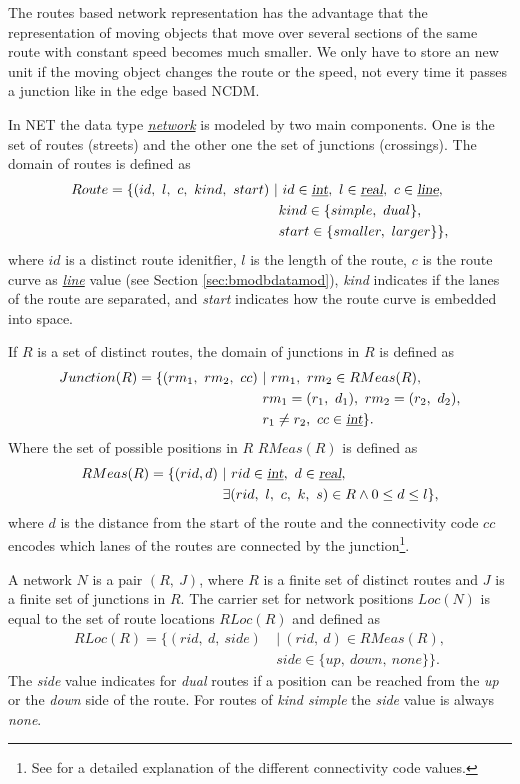 \documentclass[a4paper]{article}
\newcommand{\dt}[1]{\textsl{\underline{#1}}}
\begin{document}
The routes based network representation has the advantage that the
representation of moving objects that move over several sections of the same route
with constant speed becomes much smaller. We only have to store an new unit
if the moving object changes the route or the speed, not every time
it passes a junction like in the edge based NCDM.

In NET the data type \dt{network} is modeled by two main components. One is the
set  of routes (streets) and the other one the set of junctions (crossings). The
domain of routes is defined as
\[
\begin{split}
Route = \{(id,\ l,\ c,\ kind,\ start)\ &|\ id \in \dt{int},\ l \in \dt{real},
\ c \in \dt{line},\\
&\ kind \in \{simple,\ dual\},\\
&\ start \in \{smaller,\ larger\}\},
\end{split}
\]
where $id$ is a distinct route idenitfier, $l$ is the length of the route, $c$
is the route curve as \dt{line} value (see Section \ref{sec:bmodbdatamod}),
\textit{kind} indicates if the lanes of the route are separated, and \textit{start} indicates
how the route curve is embedded into space.

If $R$ is a set of distinct routes, the domain of junctions in $R$ is defined as
\[
  \begin{split}
    Junction(R)=\{(rm_1,\ rm_2,\ cc)\ &|\ rm_1,\ rm_2 \in RMeas(R),\\
&rm_1 = (r_1,\ d_1),\ rm_2 = (r_2,\ d_2),\\
&r_1 \neq r_2,\ cc \in \dt{int}\}.
  \end{split}
\]
Where the set of possible positions in $R$ $RMeas(R)$ is defined as
\[
  \begin{split}
    RMeas(R) = \{(rid, d)\ &|\ rid \in \dt{int},\ d \in \dt{real},\\
&\exists (rid,\ l,\ c,\ k,\ s) \in R \wedge 0 \leq d \leq l\},
  \end{split}
\]
where $d$ is the distance from the start of the route and the connectivity code
$cc$ encodes which lanes of the routes are connected
by the junction\footnote{See \cite{NetworkGueting} for a detailed
explanation of the different connectivity code values.}.

A network $N$ is a pair $(R,\ J)$, where $R$ is a finite set of distinct routes
and $J$ is a finite set of junctions in $R$. The carrier set for network
positions $Loc(N)$ is equal to the set of route locations $RLoc(R)$ and defined
as
\[
  \begin{split}
    RLoc(R)=\{(rid,\ d,\ side)\ &|\ (rid,\ d) \in RMeas(R),\\
&side \in \{up,\ down,\ none\}\}.
  \end{split}
\]
The \textit{side} value indicates for \textit{dual} routes if a position can be reached
from the \textit{up} or the \textit{down} side of the route. For routes of \textit{kind simple}
the \textit{side} value is always \textit{none}.
\end{document}
